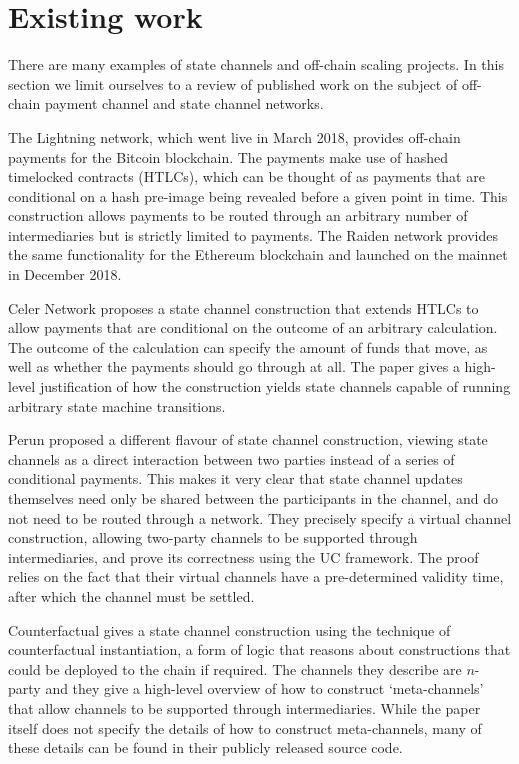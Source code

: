 \section{Existing work}

There are many examples of state channels and off-chain scaling projects. In this section we limit ourselves to a review of published work on the subject of off-chain payment channel and state channel networks.

The Lightning network, which went live in March 2018, provides off-chain payments for the Bitcoin blockchain.
The payments make use of hashed timelocked contracts (HTLCs), which can be thought of as payments that are conditional on a hash pre-image being revealed before a given point in time.
This construction allows payments to be routed through an arbitrary number of intermediaries but is strictly limited to payments.
The Raiden network provides the same functionality for the Ethereum blockchain and launched on the mainnet in December 2018.

Celer Network proposes a state channel construction that extends HTLCs to allow payments that are conditional on the outcome of an arbitrary calculation.
The outcome of the calculation can specify the amount of funds that move, as well as whether the payments should go through at all.
The paper gives a high-level justification of how the construction yields state channels capable of running arbitrary state machine transitions.

Perun proposed a different flavour of state channel construction, viewing state channels as a direct interaction between two parties instead of a series of conditional payments.
This makes it very clear that state channel updates themselves need only be shared between the participants in the channel, and do not need to be routed through a network.
They precisely specify a virtual channel construction, allowing two-party channels to be supported through intermediaries, and prove its correctness using the UC framework.
The proof relies on the fact that their virtual channels have a pre-determined validity time, after which the channel must be settled.

Counterfactual gives a state channel construction using the technique of counterfactual instantiation, a form of logic that reasons about constructions that could be deployed to the chain if required.
The channels they describe are $n$-party and they give a high-level overview of how to construct `meta-channels' that allow channels to be supported through intermediaries.
While the paper itself does not specify the details of how to construct meta-channels, many of these details can be found in their publicly released source code.

